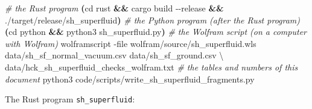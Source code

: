 \documentclass[
  10pt,
]{article}
\newenvironment{Shaded}{}{}
\newcommand{\AttributeTok}[1]{\textcolor[rgb]{0.49,0.56,0.16}{#1}}
\newcommand{\BuiltInTok}[1]{\textcolor[rgb]{0.00,0.50,0.00}{#1}}
\newcommand{\CommentTok}[1]{\textcolor[rgb]{0.38,0.63,0.69}{\textit{#1}}}
\newcommand{\DataTypeTok}[1]{\textcolor[rgb]{0.56,0.13,0.00}{#1}}
\newcommand{\ExtensionTok}[1]{#1}
\newcommand{\KeywordTok}[1]{\textcolor[rgb]{0.00,0.44,0.13}{\textbf{#1}}}
\newcommand{\NormalTok}[1]{#1}
\begin{document}
\begin{Shaded}
\begin{Highlighting}[]
\CommentTok{\# the Rust program}
\KeywordTok{(}\BuiltInTok{cd}\NormalTok{ rust }\KeywordTok{\&\&} \ExtensionTok{cargo}\NormalTok{ build }\AttributeTok{{-}{-}release} \KeywordTok{\&\&} \ExtensionTok{./target/release/sh\_superfluid}\KeywordTok{)}
\CommentTok{\# the Python program (after the Rust program)}
\KeywordTok{(}\BuiltInTok{cd}\NormalTok{ python }\KeywordTok{\&\&} \ExtensionTok{python3}\NormalTok{ sh\_superfluid.py}\KeywordTok{)}
\CommentTok{\# the Wolfram script (on a computer with Wolfram)}
\ExtensionTok{wolframscript} \AttributeTok{{-}file}\NormalTok{ wolfram/source/sh\_superfluid.wls data/sh\_sf\_normal\_vacuum.csv data/sh\_sf\_ground.csv }\DataTypeTok{\textbackslash{}}
\NormalTok{    data/hck\_sh\_superfluid\_checks\_wolfram.txt}
\CommentTok{\# the tables and numbers of this document}
\ExtensionTok{python3}\NormalTok{ code/scripts/write\_sh\_superfluid\_fragments.py}
\end{Highlighting}
\end{Shaded}

The Rust program \texttt{sh\_superfluid}:
\end{document}
